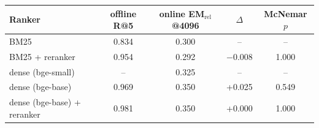 \begin{tabular}{lcccc}
\toprule
Ranker & offline R@5 & online EM$_{\text{rel}}$@4096 & $\Delta$ & McNemar $p$ \\
\midrule
BM25 & 0.834 & 0.300 & -- & -- \\
BM25 + reranker & 0.954 & 0.292 & $-$0.008 & 1.000 \\
\midrule
dense (bge-small) & -- & 0.325 & -- & -- \\
dense (bge-base) & 0.969 & 0.350 & +0.025 & 0.549 \\
dense (bge-base) + reranker & 0.981 & 0.350 & +0.000 & 1.000 \\
\bottomrule
\end{tabular}